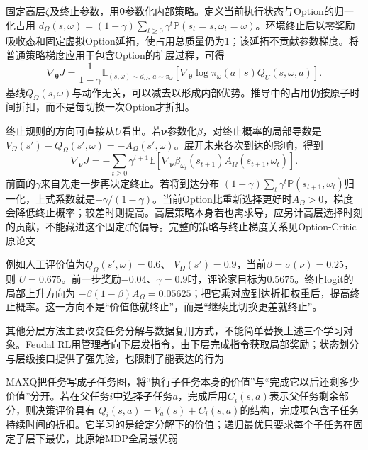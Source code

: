 固定高层$\zeta$及终止参数，用$\bm\theta$参数化内部策略。定义当前执行状态与Option的归一化占用
$d_\Omega(s,\omega)=(1-\gamma)\sum_{t\geq0}\gamma^t
\mathbb P(s_t=s,\omega_t=\omega)$。环境终止后以零奖励吸收态和固定虚拟Option延拓，使占用总质量仍为1；该延拓不贡献参数梯度。将普通策略梯度应用于包含Option的扩展过程，可得
\begin{equation}
 \nabla_{\bm\theta}J
   =\frac{1}{1-\gamma}
     \mathbb E_{(s,\omega)\sim d_\Omega,\ a\sim\pi_\omega}
       [\nabla_{\bm\theta}\log\pi_\omega(a\mid s)
                                    Q_U(s,\omega,a)].
 \label{eq:rl-learning-intra-option-gradient}
\end{equation}
基线$Q_\Omega(s,\omega)$与动作无关，可以减去以形成内部优势。推导中的占用仍按原子时间折扣，而不是每切换一次Option才折扣。

终止规则的方向可直接从$U$看出。若$\bm\nu$参数化$\beta$，对终止概率的局部导数是
$V_\Omega(s')-Q_\Omega(s',\omega)=-A_\Omega(s',\omega)$。展开未来各次到达的影响，得到
\begin{equation}
 \nabla_{\bm\nu}J
   =-\sum_{t\geq0}\gamma^{t+1}
       \mathbb E[
          \nabla_{\bm\nu}\beta_{\omega_t}(s_{t+1})
                          A_\Omega(s_{t+1},\omega_t)].
 \label{eq:rl-learning-termination-gradient}
\end{equation}
前面的$\gamma$来自先走一步再决定终止。若将到达分布
$(1-\gamma)\sum_t\gamma^t\mathbb P(s_{t+1},\omega_t)$归一化，上式系数就是$-\gamma/(1-\gamma)$。当前Option比重新选择更好时$A_\Omega>0$，梯度会降低终止概率；较差时则提高。高层策略本身若也需求导，应另计高层选择时刻的贡献，不能藏进这个固定$\zeta$的偏导。完整的策略与终止梯度关系见Option-Critic原论文

例如人工评价值为$Q_\Omega(s',\omega)=0.6$、
$V_\Omega(s')=0.9$，当前$\beta=\sigma(\nu)=0.25$，则
$U=0.675$。前一步奖励$-0.04$、$\gamma=0.9$时，评论家目标为$0.5675$。终止logit的局部上升方向为
$-\beta(1-\beta)A_\Omega=0.05625$；把它乘对应到达折扣权重后，提高终止概率。这一方向不是“价值低就终止”，而是“继续比切换更差就终止”。

其他分层方法主要改变任务分解与数据复用方式，不能简单替换上述三个学习对象。Feudal RL用管理者向下层发指令，由下层完成指令获取局部奖励；状态划分与层级接口提供了强先验，也限制了能表达的行为

MAXQ把任务写成子任务图，将“执行子任务本身的价值”与“完成它以后还剩多少价值”分开。若在父任务$i$中选择子任务$a$，完成后用$C_i(s,a)$表示父任务剩余部分，则决策评价具有
$Q_i(s,a)=V_a(s)+C_i(s,a)$的结构，完成项包含子任务持续时间的折扣。它学习的是给定分解下的价值；递归最优只要求每个子任务在固定子层下最优，比原始MDP全局最优弱

